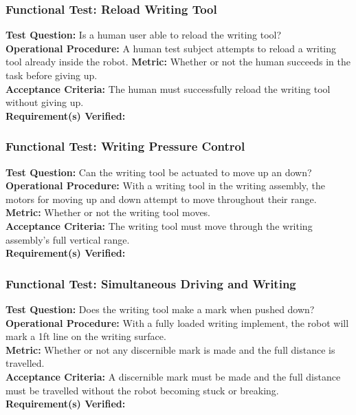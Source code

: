 \subsubsection{Functional Test: Reload Writing Tool}
\label{test:writing_ft_replace}
\textbf{Test Question:} Is a human user able to reload the writing tool? \\
\textbf{Operational Procedure:} A human test subject attempts to reload a writing tool already inside the robot.
\textbf{Metric:} Whether or not the human succeeds in the task before giving up.\\
\textbf{Acceptance Criteria:} The human must successfully reload the writing tool without giving up.  \\
\textbf{Requirement(s) Verified:}  \\

\subsubsection{Functional Test: Writing Pressure Control}
\label{test:writing_ft_pressure}
\textbf{Test Question:} Can the writing tool be actuated to move up an down?\\
\textbf{Operational Procedure:} With a writing tool in the writing assembly, the motors for moving up and down attempt to move throughout their range. \\
\textbf{Metric:} Whether or not the writing tool moves.\\
\textbf{Acceptance Criteria:} The writing tool must move through the writing assembly's full vertical range. \\
\textbf{Requirement(s) Verified:} 

\subsubsection{Functional Test: Simultaneous Driving and Writing}
\label{test:writing_ft_both}
\textbf{Test Question:} Does the writing tool make a mark when pushed down? \\
\textbf{Operational Procedure:} With a fully loaded writing implement, the robot will mark a 1ft line on the writing surface.\\
\textbf{Metric:} Whether or not any discernible mark is made and the full distance is travelled. \\
\textbf{Acceptance Criteria:} A discernible mark must be made and the full distance must be travelled without the robot becoming stuck or breaking.\\
\textbf{Requirement(s) Verified:} 

